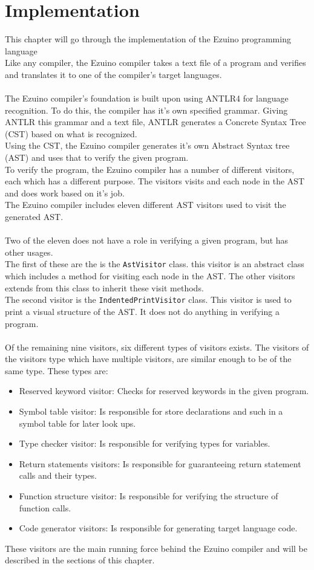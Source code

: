 \chapter{Implementation}
This chapter will go through the implementation of the Ezuino programming language\\
Like any compiler, the Ezuino compiler takes a text file of a program and verifies and translates it to one of the compiler's target languages.
\\\\
The Ezuino compiler's foundation is built upon using ANTLR4 for language recognition. To do this, the compiler has it's own specified grammar. Giving ANTLR this grammar and a text file, ANTLR generates a Concrete Syntax Tree (CST) based on what is recognized.\\
Using the CST, the Ezuino compiler generates it's own Abstract Syntax tree (AST) and uses that to verify the given program.\\
To verify the program, the Ezuino compiler has a number of different visitors, each which has a different purpose. The visitors visits and each node in the AST and does work based on it's job.\\
The Ezuino compiler includes eleven different AST visitors used to visit the generated AST.
\\\\
Two of the eleven does not have a role in verifying a given program, but has other usages.\\
The first of these are the is the \texttt{AstVisitor} class. this visitor is an abstract class which includes a method for visiting each node in the AST. The other visitors extends from this class to inherit these visit methods.\\
The second visitor is the \texttt{IndentedPrintVisitor} class. This visitor is used to print a visual structure of the AST. It does not do anything in verifying a program.
\\\\
Of the remaining nine visitors, six different types of visitors exists. The visitors of the visitors type which have multiple visitors, are similar enough to be of the same type. These types are:
\begin{itemize}
    \setlength\itemsep{0.3em}
    \item Reserved keyword visitor: Checks for reserved keywords in the given program.
    \item Symbol table visitor: Is responsible for store declarations and such in a symbol table for later look ups.
    \item Type checker visitor: Is responsible for verifying types for variables.
    \item Return statements visitors: Is responsible for guaranteeing return statement calls and their types.
    \item Function structure visitor: Is responsible for verifying the structure of function calls.
    \item Code generator visitors: Is responsible for generating target language code.
\end{itemize}
These visitors are the main running force behind the Ezuino compiler and will be described in the sections of this chapter.